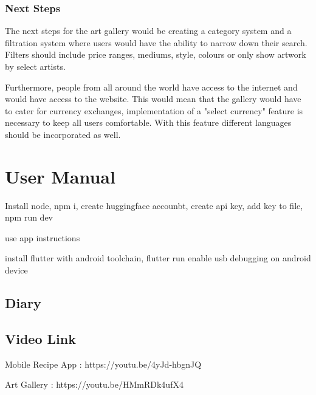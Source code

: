\documentclass[]{project_final}
\begin{document}
\subsection{Next Steps}
The next steps for the art gallery would be creating a category system and a filtration system where users would have the ability to narrow down their search. Filters should include price ranges, mediums, style, colours or only show artwork by select artists.

Furthermore, people from all around the world have access to the internet and would have access to the website. This would mean that the gallery would have to cater for currency exchanges, implementation of a "select currency" feature is necessary to keep all users comfortable.
With this feature different languages should be incorporated as well.




\chapter{User Manual}
Install node, npm i, create huggingface accounbt, create api key, add key to file, npm run dev

use app instructions

install flutter with android toolchain, flutter run
enable usb debugging on android device
\section{Diary}
\section{Video Link}

Mobile Recipe App : https://youtu.be/4yJd-hbgnJQ

Art Gallery : https://youtu.be/HMmRDk4ufX4
\end{document}
